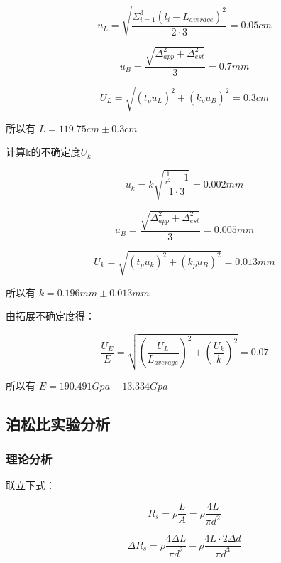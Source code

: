 \documentclass[a4paper,UTF8]{ctexart}
\begin{document}
\begin{equation}
    u_L = \sqrt{\frac{\Sigma^3_{i=1} (l_i-L_{average})^2}{2 \cdot 3}} = 0.05 cm
\end{equation}

\begin{equation}
    u_B = \frac{\sqrt{\Delta^2_{app}+\Delta^2_{est}}}{3} = 0.7 mm
\end{equation}

\begin{equation}
    U_L = \sqrt{(t_p u_L)^2+(k_p u_B)^2} = 0.3 cm
\end{equation}

所以有 $ L = 119.75cm \pm 0.3cm$

计算k的不确定度$U_k$

\begin{equation}
    u_k = k\sqrt{\frac{\frac{1}{r^2}-1}{1\cdot3}} = 0.002 mm
\end{equation}

\begin{equation}
    u_B = \frac{\sqrt{\Delta^2_{app}+\Delta^2_{est}}}{3} = 0.005 mm
\end{equation}

\begin{equation}
    U_k = \sqrt{(t_p u_k)^2+(k_p u_B)^2} = 0.013 mm
\end{equation}

所以有 $k = 0.196mm \pm 0.013mm$

由拓展不确定度得：

\begin{equation}
    \frac{U_E}{E} = \sqrt{(\frac{U_L}{L_{average}})^2+(\frac{U_k}{k})^2} = 0.07
\end{equation}

所以有 $E = 190.491 Gpa \pm 13.334 Gpa$

\subsection{泊松比实验分析}

\subsubsection{理论分析}

联立下式：

\begin{equation*}
    R_s = \rho \frac{L}{A} = \rho \frac{4L}{\pi d^2}
\end{equation*}

\begin{equation*}
    \Delta R_s = \rho \frac{4 \Delta L}{\pi d^2} - \rho \frac{4 L \cdot 2\Delta d}{\pi d^3}
\end{equation*}
\end{document}
